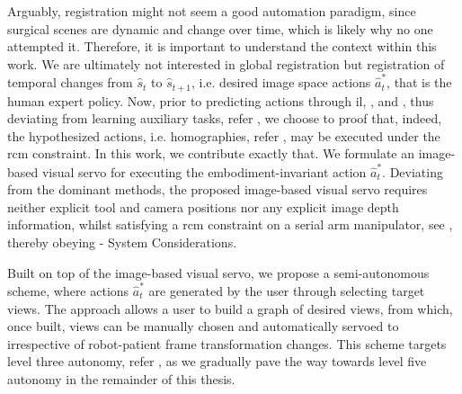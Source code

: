 Arguably, registration might not seem a good automation paradigm, since surgical scenes are dynamic and change over time, which is likely why no one attempted it. Therefore, it is important to understand the context within this work. We are ultimately not interested in global registration but registration of temporal changes from $\hat{s}_t$ to $\hat{s}_{t+1}$, i.e. desired image space actions $\hat{a}^*_t$, that is the human expert policy. Now, prior to predicting actions through \gls{il}, , and , thus deviating from learning auxiliary tasks, refer , we choose to proof that, indeed, the hypothesized actions, i.e. homographies, refer , may be executed under the \gls{rcm} constraint. In this work, we contribute exactly that. We formulate an image-based visual servo for executing the embodiment-invariant action $\hat{a}^*_t$. Deviating from the dominant methods, the proposed image-based visual servo requires neither explicit tool and camera positions nor any explicit image depth information, whilst satisfying a \gls{rcm} constraint on a serial arm manipulator, see , thereby obeying  - System Considerations.

Built on top of the image-based visual servo, we propose a semi-autonomous scheme, where actions $\hat{a}^*_t$ are generated by the user through selecting target views. The approach allows a user to build a graph of desired views, from which, once built, views can be manually chosen and automatically servoed to irrespective of robot-patient frame transformation changes. This scheme targets level three autonomy, refer , as we gradually pave the way towards level five autonomy in the remainder of this thesis.




